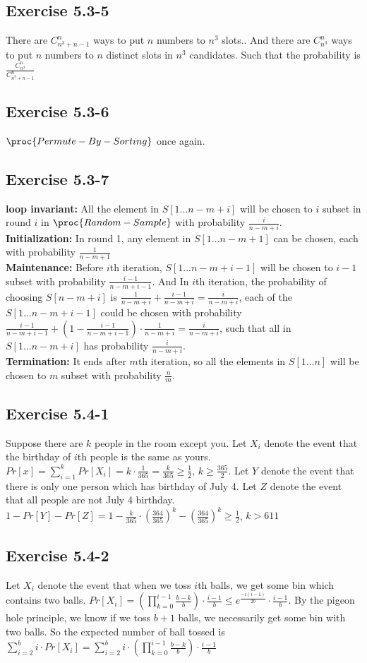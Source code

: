 \documentclass[12pt]{article}
\theoremstyle{definition}
\theoremstyle{remark}
\begin{document}
\subsection*{Exercise 5.3-5}
There are $C_{n^3+n-1}^{n}$ ways to put $n$ numbers to $n^3$ slots.. And there are $C_{n^3}^{n}$ ways to put $n$ numbers to $n$ distinct slots in $n^3$ candidates. Such that the probability is $\frac{C_{n^3}^{n}}{C_{n^3+n-1}^{n}}$
\subsection*{Exercise 5.3-6}
$\proc{Permute-By-Sorting}$ once again.
\subsection*{Exercise 5.3-7}
\textbf{loop invariant: }All the element in $S[1...n-m+i]$ will be chosen to $i$ subset in round $i$ in $\proc{Random-Sample}$ with probability $\frac{i}{n-m+i}$.\\
\textbf{Initialization: }In round 1, any element in $S[1...n-m+1]$ can be chosen, each with probability $\frac{1}{n-m+1}$\\
\textbf{Maintenance: }Before $i$th iteration, $S[1...n-m+i-1]$ will be chosen to $i-1$ subset with probability $\frac{i-1}{n-m+i-1}$. And In $i$th iteration, the probability of choosing $S[n-m+i]$ is $\frac{1}{n-m+i}+\frac{i-1}{n-m+i}=\frac{i}{n-m+i}$, each of the $S[1...n-m+i-1]$ could be chosen with probability \\ $\frac{i-1}{n-m+i-1}+(1-\frac{i-1}{n-m+i-1})\cdot\frac{1}{n-m+i}=\frac{i}{n-m+i}$, such that all in $S[1...n-m+i]$ has probability $\frac{i}{n-m+i}$.\\
\textbf{Termination: }It ends after $m$th iteration, so all the elements in $S[1...n]$ will be chosen to $m$ subset with probability $\frac{n}{m}$.
\subsection*{Exercise 5.4-1}
Suppose there are $k$ people in the room except you. Let $X_i$ denote the event that the birthday of $i$th people is the same as yours. $Pr[x]=\sum\limits_{i=1}^kPr[X_i]=k\cdot\frac{1}{365}=\frac{k}{365}\ge\frac{1}{2}$, $k\ge\frac{365}{2}$. Let $Y$ denote the event that there is only one person which has birthday of July 4. Let $Z$ denote the event that all people are not July 4 birthday. $1-Pr[Y]-Pr[Z]=1-\frac{k}{365}\cdot(\frac{364}{365})^k-(\frac{364}{365})^k\ge\frac{1}{2}$, $k>611$
\subsection*{Exercise 5.4-2}
Let $X_i$ denote the event that when we toss $i$th balls, we get some bin which contains two balls. $Pr[X_i]=(\prod\limits_{k=0}^{i-1}\frac{b-k}{b})\cdot\frac{i-1}{b}\le e^{\frac{-i(i-1)}{2b}}\cdot\frac{i-1}{b}$. By the pigeon hole principle, we know if we toss $b+1$ balls, we necessarily get some bin with two balls. So the expected number of ball tossed is $\sum\limits_{i=2}^{b}i\cdot Pr[X_i]=\sum\limits_{i=2}^{b}i\cdot(\prod\limits_{k=0}^{i-1}\frac{b-k}{b})\cdot\frac{i-1}{b}$
\end{document}
